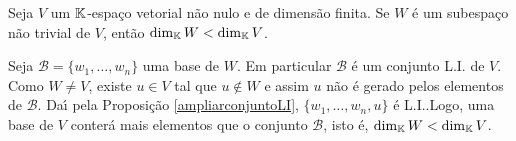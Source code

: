 \begin{proposicao}
	Seja $V$ um $\mathbb{K}$-espa\c{c}o vetorial n\~ao nulo e de dimens\~ao finita. Se $W$ \'e um subespa\c{c}o n\~ao trivial de $V$, ent\~ao $\dim_{\mathbb{K}} W < \dim_{\mathbb{K}} V$.
\end{proposicao}
\begin{prova}
	Seja $\mathcal{B} = \{w_1, \dots,w_n\}$ uma base de $W$. Em particular $\mathcal{B}$ \'e um conjunto L.I. de $V$. Como $W \ne V$, existe $u \in V$ tal que $u \notin W$ e assim $u$ n\~ao \'e gerado pelos elementos de $\mathcal{B}$. Da{\'\i} pela Proposi\c{c}\~ao \ref{ampliarconjuntoLI}, $\{w_1, \dots,w_n,u\}$ \'e L.I..Logo, uma base de $V$ conter\'a mais elementos que o conjunto $\mathcal{B}$, isto \'e, $\dim_{\mathbb{K}} W < \dim_{\mathbb{K}} V$.
\end{prova}

